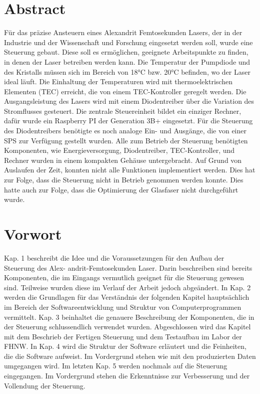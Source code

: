 \section*{Abstract}
Für das präzise Ansteuern eines Alexandrit Femtosekunden Lasers, der in der Industrie und der Wissenschaft und Forschung eingesetzt werden soll, wurde eine Steuerung gebaut. Diese soll es ermöglichen, geeignete Arbeitspunkte zu finden, in denen der Laser betreiben werden kann. Die Temperatur der Pumpdiode und des Kristalls müssen sich im Bereich von 18°C bzw. 20°C befinden, wo der Laser ideal läuft. Die Einhaltung der Temperaturen wird mit thermoelektrischen Elementen (TEC) erreicht, die von einem TEC-Kontroller geregelt werden. Die Ausgangsleistung des Lasers wird mit einem Diodentreiber über die Variation des Stromflusses gesteuert. Die zentrale Steuereinheit bildet ein einziger Rechner, dafür wurde ein Raspberry PI der Generation 3B+ eingesetzt. Für die Steuerung des Diodentreibers benötigte es noch analoge Ein- und Ausgänge, die von einer SPS zur Verfügung gestellt wurden. Alle zum Betrieb der Steuerung benötigten Komponenten, wie Energieversorgung, Diodentreiber, TEC-Kontroller, und Rechner wurden in einem kompakten Gehäuse untergebracht. Auf Grund von Auslaufen der Zeit, konnten nicht alle Funktionen implementiert werden. Dies hat zur Folge, dass die Steuerung nicht in Betrieb genommen werden konnte. Dies hatte auch zur Folge, dass die Optimierung der Glasfaser nicht durchgeführt wurde.

\clearpage
\section*{Vorwort}
Kap. 1 beschreibt die Idee und die Voraussetzungen für den Aufbau der Steuerung des Alex- andrit-Femtosekunden Laser. Darin beschreiben sind bereits Komponenten, die im Eingangs vermutlich geeignet für die Steuerung gewesen sind. Teilweise wurden diese im Verlauf der Arbeit jedoch abgeändert. In Kap. 2 werden die Grundlagen für das Verständnis der folgenden Kapitel hauptsächlich im Bereich der Softwareentwicklung und Struktur von Computerprogrammen vermittelt. Kap. 3 beinhaltet die genauere Beschreibung der Komponenten, die in der Steuerung schlussendlich verwendet wurden. Abgeschlossen wird das Kapitel mit dem Beschrieb der Fertigen Steuerung und dem Testaufbau im Labor der FHNW. In Kap. 4 wird die Struktur der Software erläutert und die Feinheiten, die die Software aufweist. Im Vordergrund stehen wie mit den produzierten Daten umgegangen wird. Im letzten Kap. 5 werden nochmals auf die Steuerung eingegangen. Im Vordergrund stehen die Erkenntnisse zur Verbesserung und der Vollendung der Steuerung.

